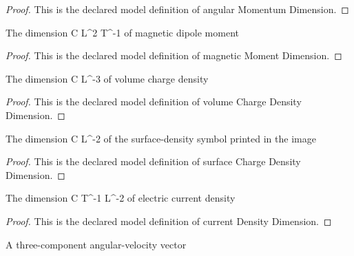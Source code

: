 \begin{proof}
  This is the declared model definition of angular Momentum Dimension.
\end{proof}
\begin{definition}
  \label{def:physics:phyx-mini-0627:phyxminiproblems-problemphyxmini0627-magneticmomentdimension}
  The dimension C L\textasciicircum{}2 T\textasciicircum{}-1 of magnetic dipole moment
\end{definition}
\begin{proof}
  This is the declared model definition of magnetic Moment Dimension.
\end{proof}
\begin{definition}
  \label{def:physics:phyx-mini-0627:phyxminiproblems-problemphyxmini0627-volumechargedensitydimension}
  The dimension C L\textasciicircum{}-3 of volume charge density
\end{definition}
\begin{proof}
  This is the declared model definition of volume Charge Density Dimension.
\end{proof}
\begin{definition}
  \label{def:physics:phyx-mini-0627:phyxminiproblems-problemphyxmini0627-surfacechargedensitydimension}
  The dimension C L\textasciicircum{}-2 of the surface-density symbol printed in the image
\end{definition}
\begin{proof}
  This is the declared model definition of surface Charge Density Dimension.
\end{proof}
\begin{definition}
  \label{def:physics:phyx-mini-0627:phyxminiproblems-problemphyxmini0627-currentdensitydimension}
  The dimension C T\textasciicircum{}-1 L\textasciicircum{}-2 of electric current density
\end{definition}
\begin{proof}
  This is the declared model definition of current Density Dimension.
\end{proof}
\begin{definition}
  \label{def:physics:phyx-mini-0627:phyxminiproblems-problemphyxmini0627-angularvelocityvector}
  A three-component angular-velocity vector
\end{definition}
